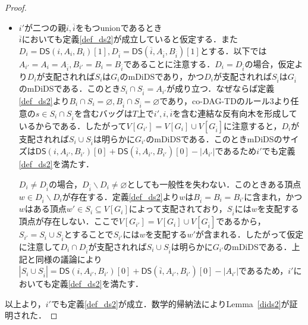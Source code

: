 \documentclass[master]{kuisthesis}		%
\def\|{\verb|}
\theoremstyle{plain}
\theoremstyle{definition}
\begin{document}
\begin{proof}
\begin{itemize}
        \item $i'$が二つの親$i, \overline{i}$をもつunionであるとき \\
        $\overline{i}$においても定義\ref{def_ds2}が成立していると仮定する．また$D_i = \mathsf{DS}(i, A_i, B_i)[1], D_{\overline{i}} = \mathsf{DS}(\overline{i}, A_{\overline{i}}, B_{\overline{i}})[1]$とする．以下では$A_{i'} = A_{i} = A_{\overline{i}}, B_{i'} = B_{i} = B_{\overline{i}}$であることに注意する．$D_i = D_{\overline{i}}$の場合，仮定より$D_i$が支配されれば$S_i$は$G_i$のmDiDSであり，かつ$D_i$が支配されれば$S_{\overline{i}}$は$G_{\overline{i}}$のmDiDSである．このとき$S_{i} \cap S_{\overline{i}} = A_{i'}$が成り立つ．なぜならば定義\ref{def_ds2}より$B_{i} \cap S_i = \varnothing, B_{\overline{i}} \cap S_{\overline{i}} = \varnothing$であり，co-DAG-TDのルール3より任意の$s \in S_{i} \cap S_{\overline{i}}$を含むバッグは$T$上で$i', i, \overline{i}$を含む連結な反有向木を形成しているからである．したがって$V[G_{i'}] = V[G_i] \cup V[G_{\overline{i}}]$に注意すると，$D_i$が支配されれば$S_i \cup S_{\overline{i}}$は明らかに$G_{i'}$のmDiDSである．このときmDiDSのサイズは$\mathsf{DS}(i, A_{i'}, B_{i'})[0] + \mathsf{DS}(\overline{i}, A_{i'}, B_{i'})[0] - |A_{i'}|$であるため$i'$でも定義\ref{def_ds2}を満たす．

        $D_i \neq D_{\overline{i}}$の場合，$D_{\overline{i}} \backslash D_i \neq \varnothing$としても一般性を失わない．このときある頂点$w \in D_{\overline{i}} \backslash D_i$が存在する．定義\ref{def_ds2}より$w$は$B_{\overline{i}} = B_{i} = B_{i'}$に含まれ，かつ$w$はある頂点$w' \in S_i\subseteq V[G_i]$によって支配されており，$S_{\overline{i}}$には$w$を支配する頂点が存在しない．ここで$V[G_{i'}] = V[G_i] \cup V[G_{\overline{i}}]$であるから，$S_{i'} = S_i \cup S_{\overline{i}}$とすることで$S_{i'}$には$w$を支配する$w'$が含まれる．したがって仮定に注意して$D_i \cap D_{\overline{i}}$が支配されれば$S_i \cup S_{\overline{i}}$は明らかに$G_{i'}$のmDiDSである．上記と同様の議論により$|S_i \cup S_{\overline{i}}| = \mathsf{DS}(i, A_{i'}, B_{i'})[0] + \mathsf{DS}(\overline{i}, A_{i'}, B_{i'})[0] - |A_{i'}|$であるため，$i'$においても定義\ref{def_ds2}を満たす．
        
    \end{itemize}
    以上より，$i'$でも定義\ref{def_ds2}が成立．数学的帰納法によりLemma~\ref{dids2}が証明された．
\end{proof}






\end{document}
